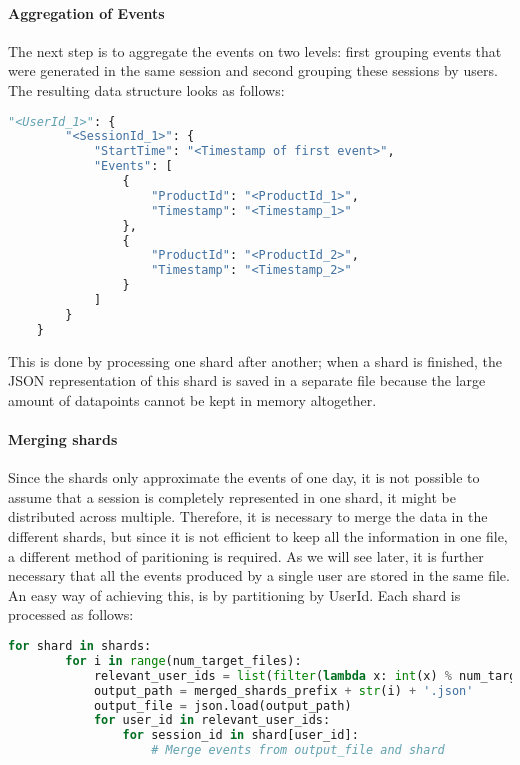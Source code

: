 \paragraph{Aggregation of Events}
The next step is to aggregate the events on two levels: first grouping events that were generated in the same session and second grouping these sessions by users.
The resulting data structure looks as follows:

\begin{minipage}{\linewidth}
    \begin{lstlisting}[language=Python,frame=single,caption=Data Structure for user-events,label=code:user-events]
    "<UserId_1>": {
        "<SessionId_1>": {
            "StartTime": "<Timestamp of first event>",
            "Events": [
                {
                    "ProductId": "<ProductId_1>",
                    "Timestamp": "<Timestamp_1>"
                },
                {
                    "ProductId": "<ProductId_2>",
                    "Timestamp": "<Timestamp_2>"
                }
            ]
        }
    }
    \end{lstlisting}
\end{minipage}
This is done by processing one shard after another; when a shard is finished, the JSON representation of this shard is saved in a separate file because the large amount of datapoints cannot be kept in memory altogether.
\paragraph{Merging shards}
Since the shards only approximate the events of one day, it is not possible to assume that a session is completely represented in one shard, it might be distributed across multiple.
Therefore, it is necessary to merge the data in the different shards, but since it is not efficient to keep all the information in one file, a different method of paritioning is required.
As we will see later, it is further necessary that all the events produced by a single user are stored in the same file.
An easy way of achieving this, is by partitioning by UserId.
Each shard is processed as follows:

\begin{minipage}{\linewidth}
    \begin{lstlisting}[language=Python,frame=single,caption=Merging shards,label=code:merging-shards]
    for shard in shards:
        for i in range(num_target_files):
            relevant_user_ids = list(filter(lambda x: int(x) % num_target_files == i, shard.keys()))
            output_path = merged_shards_prefix + str(i) + '.json'
            output_file = json.load(output_path)
            for user_id in relevant_user_ids:
                for session_id in shard[user_id]:
                    # Merge events from output_file and shard
    \end{lstlisting}
\end{minipage}
